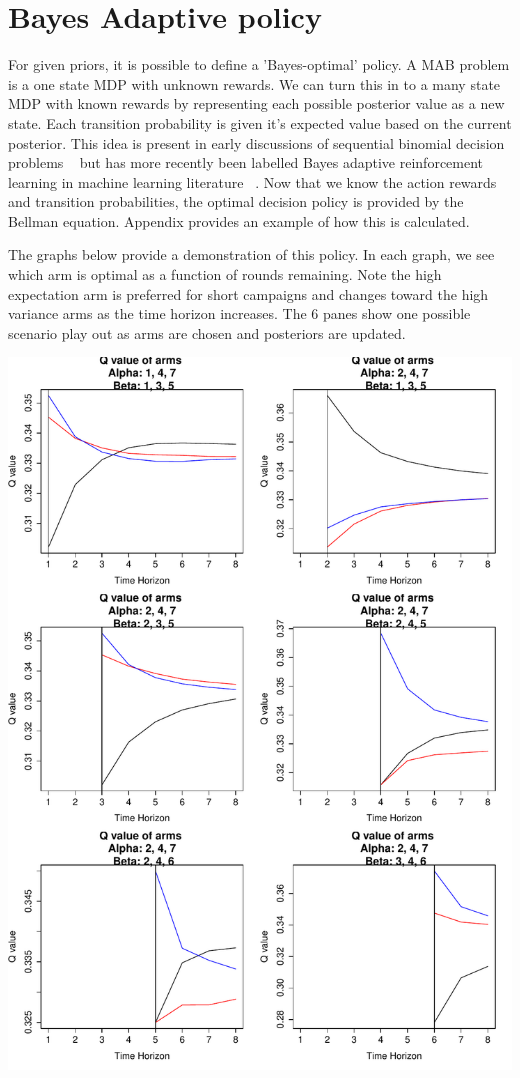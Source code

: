 \documentclass[11pt,a4,singlespacing,titlepagenumber=on]{scrreprt}
\numberwithin{equation}{chapter} %
\theoremstyle{remark}
\begin{document}
\section{ Bayes Adaptive policy }

For given priors, it is possible to define a 'Bayes-optimal' policy. A MAB problem is a one state MDP with unknown rewards. We can turn this in to a many state MDP with known rewards by representing each possible posterior value as a new state. Each transition probability is given it's expected value based on the current posterior. This idea is present in early discussions of sequential binomial decision problems ~\cite{chernoff1965bayes} but has more recently been labelled Bayes adaptive reinforcement learning in machine learning literature ~\cite{duff2002optimal}. Now that we know the action rewards and transition probabilities, the optimal decision policy is provided by the Bellman equation. Appendix provides an example of how this is calculated.

The graphs below provide a demonstration of this policy. In each graph, we see which arm is optimal as a function of rounds remaining. Note the high expectation arm is preferred for short campaigns and changes toward the high variance arms as the time horizon increases. The 6 panes show one possible scenario play out as arms are chosen and posteriors are updated.

\includegraphics[scale=0.7]{BARLillustration.pdf}
\end{document}
